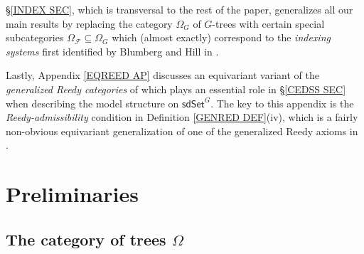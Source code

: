 \documentclass[a4paper,10pt
,draft
]{article}%
\begin{document}
\S \ref{INDEX SEC}, which is transversal to the rest of the paper, generalizes all our main results by replacing the category $\Omega_G$ of $G$-trees
with certain special subcategories
$\Omega_{\mathcal{F}} \subseteq \Omega_G$
which (almost exactly) correspond to the 
\textit{indexing systems} first identified
by Blumberg and Hill in \cite{BH15}.

Lastly, Appendix \ref{EQREED AP} discusses an equivariant variant of the \textit{generalized Reedy categories}
of \cite{BM11} which plays an essential role in \S \ref{CEDSS SEC}
when describing the model structure on $\mathsf{sdSet}^G$.
The key to this appendix is the \textit{Reedy-admissibility} condition in 
Definition \ref{GENRED DEF}(iv),
which is a fairly non-obvious equivariant generalization of one of the generalized Reedy axioms in \cite{BM11}.



\section{Preliminaries}\label{PREL SEC}

\subsection{The category of trees $\Omega$}
\end{document}
